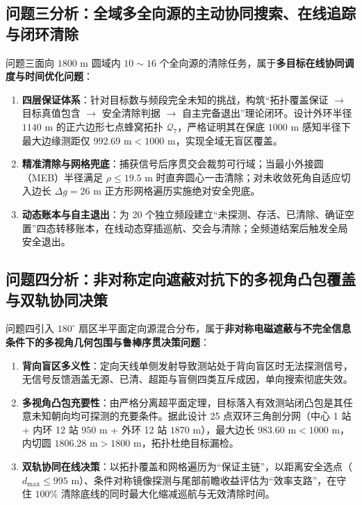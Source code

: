 \documentclass[zihao=-4,a4paper,UTF8]{ctexart}
\begin{document}
\subsection{问题三分析：全域多全向源的主动协同搜索、在线追踪与闭环清除}
问题三面向 $1800\text{ m}$ 圆域内 $10\sim 16$ 个全向源的清除任务，属于\textbf{多目标在线协同调度与时间优化问题}：
\begin{enumerate}[leftmargin=2.0em, itemsep=0.1em, topsep=0.1em]
    \item \textbf{四层保证体系}：针对目标数与频段完全未知的挑战，构筑“拓扑覆盖保证 $\to$ 目标真值包含 $\to$ 安全清除判据 $\to$ 自主完备退出”理论闭环。设计外环半径 $1140\text{ m}$ 的正六边形七点蜂窝拓扑 $\mathcal{Q}_7$，严格证明其在保底 $1000\text{ m}$ 感知半径下最大边缘测距仅 $992.69\text{ m} < 1000\text{ m}$，实现全域无盲区覆盖。
    \item \textbf{精准清除与网格兜底}：捕获信号后序贯交会裁剪可行域；当最小外接圆（MEB）半径满足 $\rho \le 19.5\text{ m}$ 时直奔圆心一击清除；对未收敛死角自适应切入边长 $\Delta g = 26\text{ m}$ 正方形网格遍历实施绝对安全兜底。
    \item \textbf{动态账本与自主退出}：为 20 个独立频段建立“未探测、存活、已清除、确证空置”四态转移账本，在线动态穿插巡航、交会与清除；全频道结案后触发全局安全退出。
\end{enumerate}

\subsection{问题四分析：非对称定向遮蔽对抗下的多视角凸包覆盖与双轨协同决策}
问题四引入 $180^\circ$ 扇区半平面定向源混合分布，属于\textbf{非对称电磁遮蔽与不完全信息条件下的多视角几何包围与鲁棒序贯决策问题}：
\begin{enumerate}[leftmargin=2.0em, itemsep=0.1em, topsep=0.1em]
    \item \textbf{背向盲区多义性}：定向天线单侧发射导致测站处于背向盲区时无法探测信号，无信号反馈涵盖无源、已清、超距与盲侧四类互斥成因，单向搜索彻底失效。
    \item \textbf{多视角凸包充要性}：由严格分离超平面定理，目标落入有效测站闭凸包是其任意未知朝向均可探测的充要条件。据此设计 25 点双环三角剖分网（中心 1 站 + 内环 12 站 $950\text{ m}$ + 外环 12 站 $1870\text{ m}$），最大边长 $983.60\text{ m} < 1000\text{ m}$，内切圆 $1806.28\text{ m} > 1800\text{ m}$，拓扑杜绝目标漏检。
    \item \textbf{双轨协同在线决策}：以拓扑覆盖和网格遍历为“保证主链”，以距离安全选点（$d_{\max}\le 995\text{ m}$）、条件对称镜像探测与尾部前瞻收益评估为“效率支路”，在守住 $100\%$ 清除底线的同时最大化缩减巡航与无效清除时间。
\end{enumerate}
\end{document}
